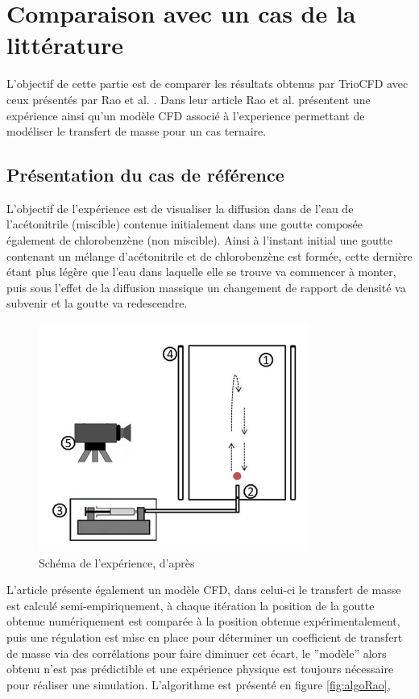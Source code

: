\chapter{Comparaison avec un cas de la littérature}
L'objectif de cette partie est de comparer les résultats obtenus par TrioCFD avec ceux présentés par Rao et al. \cite{rao_influence_2015}. Dans leur article Rao et al. présentent une expérience ainsi qu'un modèle CFD associé à l'experience permettant de modéliser le transfert de masse pour un cas ternaire.
\section{Présentation du cas de référence}
L'objectif de l'expérience est de visualiser la diffusion dans de l'eau de l'acétonitrile (miscible) contenue initialement dans une goutte composée également de chlorobenzène (non miscible). Ainsi à l'instant initial une goutte contenant un mélange d'acétonitrile et de chlorobenzène est formée, cette dernière étant plus légère que l'eau dans laquelle elle se trouve va commencer à monter, puis sous l'effet de la diffusion massique un changement de rapport de densité va subvenir et la goutte va redescendre.  
\begin{figure}[H]
	\centering
	\includegraphics[width=0.3\linewidth]{figure/exp}
	\caption{Schéma de l'expérience, d'après \cite{rao_influence_2015}}
	\label{fig:exp}
\end{figure}
L'article présente également un modèle CFD, dans celui-ci le transfert de masse est calculé semi-empiriquement, à chaque itération la position de la goutte obtenue numériquement est comparée à la position obtenue expérimentalement, puis une régulation est mise en place pour déterminer un coefficient de transfert de masse via des corrélations pour faire diminuer cet écart, le ”modèle” alors obtenu n’est pas prédictible et une expérience physique est toujours nécessaire pour réaliser une simulation. L'algorithme est présenté en figure \ref{fig:algoRao}, 
